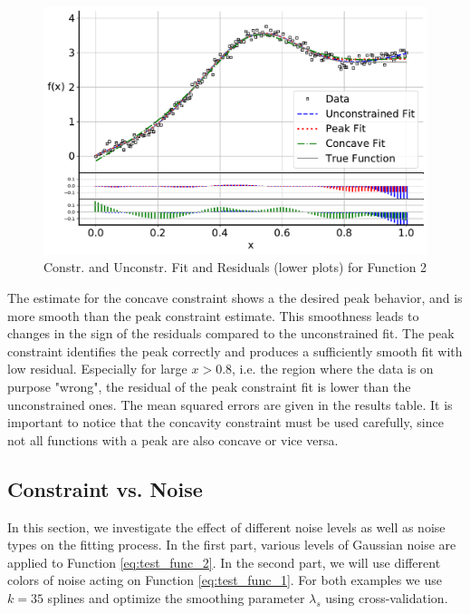 \documentclass[10pt,a4paper]{article}
\begin{document}
\begin{figure}[H]
	\centering
	\includegraphics[width=\columnwidth]{../thesisplots/exp_peak_fit.pdf}
	\caption{Constr. and Unconstr. Fit and Residuals (lower plots) for Function 2}
	\label{fig:test_func_2_fit}
\end{figure}
 
The estimate for the concave constraint shows a the desired peak behavior, and is more smooth than the peak constraint estimate. This smoothness leads to changes in the sign of the residuals compared to the unconstrained fit. The peak constraint identifies the peak correctly and produces a sufficiently smooth fit with low residual. Especially for large $x >0.8$, i.e. the region where the data is on purpose "wrong", the residual of the peak constraint fit is lower than the unconstrained ones. The mean squared errors are given in the results table. 
It is important to notice that the concavity constraint must be used carefully, since not all functions with a peak are also concave or vice versa.

\subsection{Constraint vs. Noise}

In this section, we investigate the effect of different noise levels as well as noise types on the fitting process. In the first part, various levels of Gaussian noise are applied to Function \ref{eq:test_func_2}. In the second part, we will use different colors of noise acting on Function \ref{eq:test_func_1}. For both examples we use $k=35$ splines and optimize the smoothing parameter $\lambda_s$ using cross-validation. 
\end{document}

